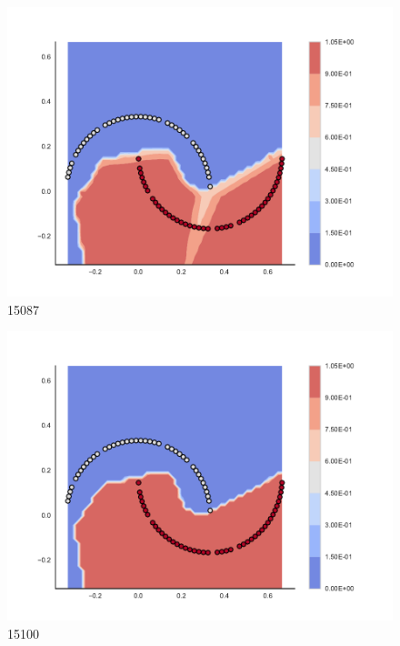 \begin{subfigure}[b]{0.09\textwidth}
    \includegraphics[clip, trim=2.35cm 1.75cm 4.5cm 0cm,width=\textwidth]{img/convergence/15087.pdf}
    \caption{15087}
    \label{fig:convergence_15087}
\end{subfigure}
%
\begin{subfigure}[b]{0.09\textwidth}
    \includegraphics[clip, trim=2.35cm 1.75cm 4.5cm 0cm,width=\textwidth]{img/convergence/15100.pdf}
    \caption{15100}
    \label{fig:convergence_15100}
\end{subfigure}
%
